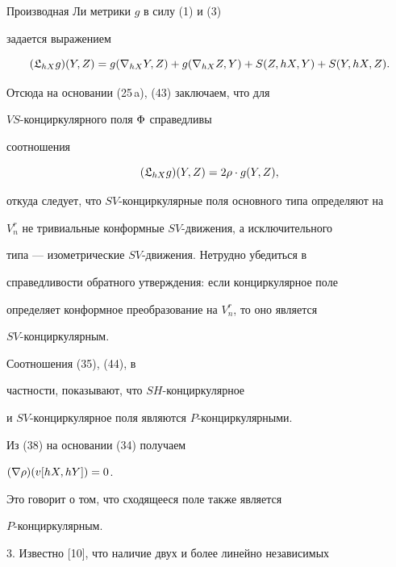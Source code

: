 \begin{note}


Производная Ли метрики $g$ в силу (1) и (3)


задается выражением


$$


( \frak


{L}_{hX}g)(Y,Z)=g(\nb_{hX}Y,Z)+g(\nb_{hX}Z,Y)+S(Z,hX,Y)+S(Y,hX,Z).


$$


Отсюда на основании (25\,a), (43) заключаем, что для


$VS$-конциркулярного поля $\Phi$ справедливы


соотношения


$$


( \frak {L}_{hX}g)(Y,Z)=2\ro\cdot g(Y,Z),


$$


откуда следует, что $SV$-конциркулярные поля основного типа определяют на


$V^r_n$ не тривиальные конформные $SV$-движения, а исключительного


типа --- изометрические $SV$-движения. Нетрудно убедиться в


справедливости обратного утверждения: если конциркулярное поле


определяет конформное преобразование на $V^r_n$, то оно является


$SV$-конциркулярным.


\end{note}





\begin{note}


Соотношения (35), (44), в


частности, показывают, что $SH$-конциркулярное


и $SV$-конциркулярное поля являются $P$-конциркулярными.


Из (38) на основании (34) получаем


$(\nabla \rho)(v[hX,hY])=0$.


Это говорит о том, что сходящееся поле также является


$P$-конциркулярным.


\end{note}





3. Известно [10], что наличие двух и более линейно независимых


